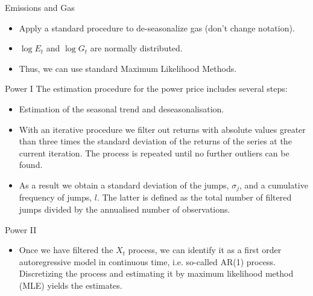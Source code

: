 
{Emissions and Gas}
\begin{itemize}
\item Apply a standard procedure to de-seasonalize gas (don't change notation).
\item $\log E_t$ and $\log G_t$ are normally distributed.
\item Thus, we can use standard Maximum Likelihood Methods.
\end{itemize}

{Power I}
The estimation procedure for the power price includes several steps:
\begin{itemize}
\item Estimation of the seasonal trend and deseasonalisation.
\item With an iterative procedure we filter out returns with absolute values greater than three times the standard deviation of the returns of the series at the current iteration. The process is repeated until no further outliers can be found.
\item As a result we obtain a standard deviation of the jumps, $\sigma_j$, and a cumulative frequency of jumps, $l$. The latter is defined as the total number of filtered jumps divided by the annualised number of observations.
\end{itemize}

{Power II}
\begin{itemize}
\item Once we have filtered the $X_t$ process, we can identify it as a first order autoregressive model in continuous time, i.e. so-called AR(1) process. Discretizing the process and estimating it by maximum likelihood method (MLE) yields the estimates.
\end{itemize}


